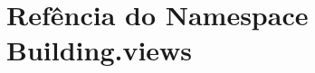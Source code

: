 \hypertarget{namespaceBuilding_1_1views}{\section{Refência do Namespace Building.\-views}
\label{d0/d1b/namespaceBuilding_1_1views}
}
